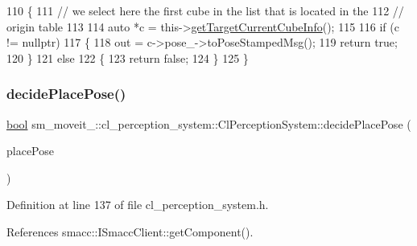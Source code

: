 \begin{DoxyCode}
110             \{
111                 \textcolor{comment}{// we select here the first cube in the list that is located in the}
112                 \textcolor{comment}{// origin table}
113 
114                 \textcolor{keyword}{auto} *c = this->\hyperlink{classsm__moveit__4_1_1cl__perception__system_1_1ClPerceptionSystem_ac4b944cebb2055a85a33129665df5dcf}{getTargetCurrentCubeInfo}();
115 
116                 \textcolor{keywordflow}{if} (c != \textcolor{keyword}{nullptr})
117                 \{
118                     out = c->pose\_->toPoseStampedMsg();
119                     \textcolor{keywordflow}{return} \textcolor{keyword}{true};
120                 \}
121                 \textcolor{keywordflow}{else}
122                 \{
123                     \textcolor{keywordflow}{return} \textcolor{keyword}{false};
124                 \}
125             \}
\end{DoxyCode}
\mbox{\label{classsm__moveit__4_1_1cl__perception__system_1_1ClPerceptionSystem_af6ff9a225d451bdee312573296ed02a8}} 
\subsubsection{\texorpdfstring{decide\+Place\+Pose()}{decidePlacePose()}}
{\footnotesize\ttfamily \hyperlink{classbool}{bool} sm\+\_\+moveit\+\_\+::cl\+\_\+perception\+\_\+system\+::\+Cl\+Perception\+System\+::decide\+Place\+Pose (\begin{DoxyParamCaption}\item[{geometry\+\_\+msgs\+::\+Pose\+Stamped \&}]{place\+Pose }\end{DoxyParamCaption})\hspace{0.3cm}{\ttfamily [inline]}}



Definition at line 137 of file cl\+\_\+perception\+\_\+system.\+h.



References smacc\+::\+I\+Smacc\+Client\+::get\+Component().


